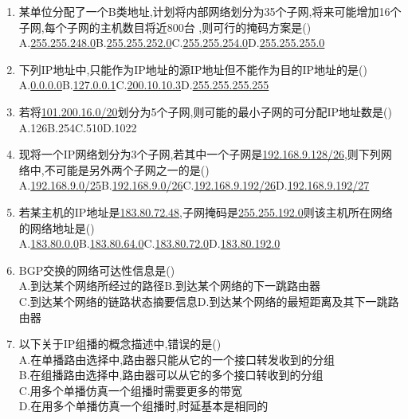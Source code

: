 \documentclass[12pt, a4paper, oneside, UTF8]{ctexbook}
\begin{document}
\begin{enumerate}
    \item 某单位分配了一个B类地址,计划将内部网络划分为35个子网,将来可能增加16个子网,每个子网的主机数目将近800台
    ,则可行的掩码方案是() \\
    A.\underline{255.255.248.0}\qquad B.\underline{255.255.252.0}\qquad C.\underline{255.255.254.0}\qquad D.\underline{255.255.255.0}

    \item 下列IP地址中,只能作为IP地址的源IP地址但不能作为目的IP地址的是() \\
    A.\underline{0.0.0.0}\qquad B.\underline{127.0.0.1}\qquad C.\underline{200.10.10.3}\qquad D.\underline{255.255.255.255}

    \item 若将\underline{101.200.16.0/20}划分为5个子网,则可能的最小子网的可分配IP地址数是() \\
    A.126\qquad B.254\qquad C.510\qquad D.1022

    \item 现将一个IP网络划分为3个子网,若其中一个子网是\underline{192.168.9.128/26},则下列网络中,不可能是另外两个子网之一的是() \\
    A.\underline{192.168.9.0/25}\quad B.\underline{192.168.9.0/26}\quad C.\underline{192.168.9.192/26}\quad D.\underline{192.168.9.192/27}

    \item 若某主机的IP地址是\underline{183.80.72.48},子网掩码是\underline{255.255.192.0}则该主机所在网络的网络地址是() \\
    A.\underline{183.80.0.0}\qquad B.\underline{183.80.64.0}\qquad C.\underline{183.80.72.0}\qquad D.\underline{183.80.192.0}

    \item BGP交换的网络可达性信息是() \\
    A.到达某个网络所经过的路径\qquad B.到达某个网络的下一跳路由器 \\
    C.到达某个网络的链路状态摘要信息\quad D.到达某个网络的最短距离及其下一跳路由器

    \item 以下关于IP组播的概念描述中,错误的是() \\
    A.在单播路由选择中,路由器只能从它的一个接口转发收到的分组 \\
    B.在组播路由选择中,路由器可以从它的多个接口转收到的分组 \\
    C.用多个单播仿真一个组播时需要更多的带宽 \\
    D.在用多个单播仿真一个组播时,时延基本是相同的


\end{enumerate}
\end{document}
